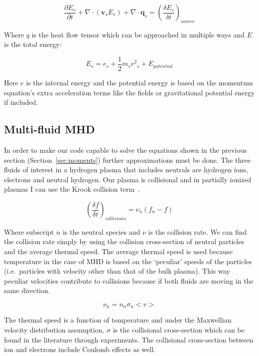 \documentclass[12pt,upcase]{umlthesis}
\begin{document}
\begin{equation}\label{eq:energyequation}
	\frac{\partial E_s}{\partial t} + \nabla \cdot (\textbf{v}_s E_s) + \nabla \cdot \textbf{q}_s = {(\frac{\delta E_s}{\delta t})}_{source}
\end{equation}

Where $q$ is the heat flow tensor which can be approached in multiple ways and $E$ is the total energy:

\begin{equation}\label{eq:energy}
	E_s = e_s + \frac{1}{2} m_s {v^2}_s + E_{potential}
\end{equation}

Here $e$ is the internal energy and the potential energy is based on the momentum equation's extra acceleration terms like the fields or gravitational potential energy if included.

\subsection{Multi-fluid MHD}\label{sec:multifluidmhd}

In order to make our code capable to solve the equations shown in the previous section (Section~\ref{sec:moments}) further approximations must be done. The three fluids of interest in a hydrogen plasma that includes neutrals are hydrogen ions, electrons and neutral hydrogen. Our plasma is collisional and in partially ionized plasmas I can use the Krook collision term~\citep{bhatnagar1954}.

\begin{equation}\label{eq:krook}
	{(\frac{\delta f}{\delta t})}_{collisions} = \nu_n (f_n - f)
\end{equation}

Where subscript $n$ is the neutral species and $\nu$ is the collision rate. We can find the collision rate simply by using the collision cross-section of neutral particles and the average thermal speed. The average thermal speed is used because temperature in the case of MHD is based on the `peculiar' speeds of the particles (i.e.\ particles with velocity other than that of the bulk plasma). This way peculiar velocities contribute to collisions because if both fluids are moving in the same direction.

\begin{equation}\label{eq:collisionrate}
	\nu_n = n_n \sigma_n <v>
\end{equation}

The thermal speed is a function of temperature and under the Maxwellian velocity distribution assumption, $\sigma$ is the collisional cross-section which can be found in the literature through experiments. The collisional cross-section between ion and electrons include Coulomb effects as well.
\end{document}
